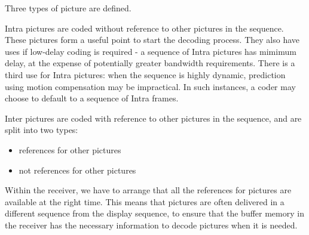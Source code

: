 Three types of picture are defined.

Intra pictures are coded without reference to other pictures in the
sequence. These pictures form a useful point to start the decoding
process. They also have uses if low-delay coding is required - a
sequence of Intra pictures has mimimum delay, at the expense of
potentially greater bandwidth requirements. There is a third use for
Intra pictures: when the sequence is highly dynamic, prediction using
motion compensation may be impractical. In such instances, a coder may
choose to default to a sequence of Intra frames.

Inter pictures are coded with reference to other pictures in the
sequence, and are split into two types:
\begin{itemize}
	\item references for other pictures
	\item not references for other pictures
\end{itemize}

Within the receiver, we have to arrange that all the references for
pictures are available at the right time. This means that pictures are
often delivered in a different sequence from the display sequence, to
ensure that the buffer memory in the receiver has the necessary
information to decode pictures when it is needed.

